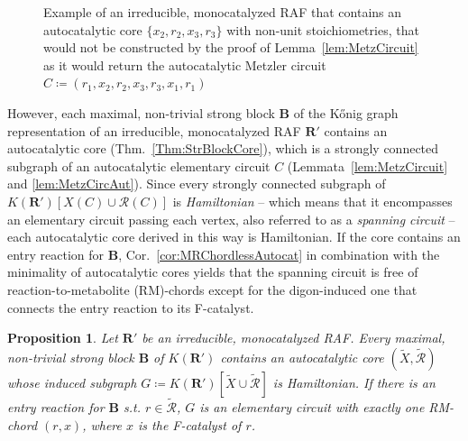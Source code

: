 \documentclass[pdflatex]{sn-jnl}
\theoremstyle{thmstyleone}%
\newtheorem{proposition}[theorem]{Proposition}%
\theoremstyle{examplesty}%
\theoremstyle{thmstylethree}%
\newcommand{\king}{K}
\newcommand{\CR}[0]{\mathcal{R}}
\newcommand{\RAF}[0]{\mathbf{R}'}
\newcommand{\block}[0]{\mathbf{B}}
\begin{document}
{\begin{figure}[htb]
\begin{minipage}[c]{0.5\textwidth}
	\end{minipage}
	\caption{Example of an irreducible, monocatalyzed RAF that contains an autocatalytic core $\{x_2,r_2,x_3,r_3\}$ with non-unit stoichiometries, that would not be constructed by the proof of Lemma~\ref{lem:MetzCircuit} as it would return the autocatalytic
	Metzler circuit $C\coloneqq (r_1,x_2,r_2,x_3,r_3,x_1,r_1)$}
	\label{fig:NonUnStoich}
\end{figure}

However, each maximal, non-trivial strong block $\block$ of the K\H{o}nig graph representation of an irreducible, monocatalyzed RAF $\RAF$ contains an autocatalytic core (Thm.~\ref{Thm:StrBlockCore}), which is a strongly connected subgraph \cite{golnik_autocatalytic_2026} of an autocatalytic elementary circuit $C$ (Lemmata~\ref{lem:MetzCircuit} and \ref{lem:MetzCircAut}). Since every strongly connected subgraph of $\king(\RAF)[X(C)\cup \CR(C)]$ is \emph{Hamiltonian} \cite{bang-jensen_digraphs_2002} -- which means that it encompasses an elementary circuit passing each vertex, also referred to as a \emph{spanning circuit} -- each autocatalytic core derived in this way is Hamiltonian. If the core contains an entry reaction for $\block$, Cor.~\ref{cor:MRChordlessAutocat} in combination with the minimality of autocatalytic cores yields that the spanning circuit is free of reaction-to-metabolite (RM)-chords except for the digon-induced one that connects the entry reaction to its F-catalyst.

\vspace{6pt}
\begin{proposition}\label{Prop:OneCircCorePerBlock}
	Let $\RAF$ be an irreducible, monocatalyzed RAF. Every maximal, non-trivial strong block $\block$ of $\king(\RAF)$ contains an autocatalytic core $(\tilde{X},\tilde{\CR})$ whose induced subgraph $G\coloneqq\king(\RAF)[\tilde{X}\cup \tilde{\CR}]$ is Hamiltonian. If there is an entry reaction for $\block$ s.t. $r\in \tilde{\CR}$, $G$ is an elementary circuit with exactly one RM-chord $(r,x)$, where $x$ is the F-catalyst of $r$. 
\end{proposition}
\vspace{6pt}
}
\end{document}
